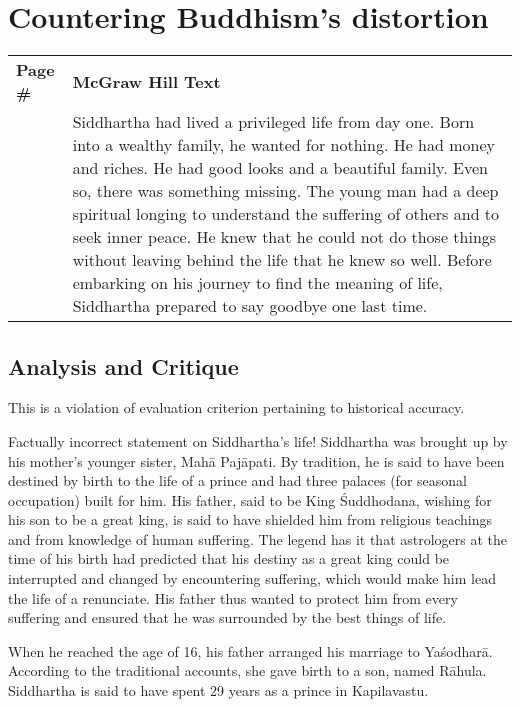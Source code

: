 \chapter{Countering Buddhism's distortion}

{\renewcommand{\arraystretch}{1.2}
\begin{longtable}{|>{\raggedleft}p{1.5cm}|p{8.5cm}|}
\multicolumn{2}{c}{\textbf{Table: 1}}\\
\hline
\textbf{Page \#} & \textbf{McGraw Hill Text} \tabularnewline
\hline 
260 & Siddhartha had lived a privileged life from day one. Born into a wealthy family, he wanted for nothing. He had money and riches. He had good looks and a beautiful family. Even so, there was something missing. The young man had a deep spiritual longing to understand the suffering of others and to seek inner peace. He knew that he could not do those things without leaving behind the life that he knew so well. Before embarking on his journey to find the meaning of life, Siddhartha prepared to say goodbye one last time.\tabularnewline
\hline
\end{longtable}}
\medskip

\section*{Analysis and Critique} 

This is a violation of evaluation criterion pertaining to historical accuracy.
\vskip 3pt

Factually incorrect statement on Siddhartha's life! Siddhartha was brought up by his mother's younger sister, Mahā Pajāpati. By tradition, he is said to have been destined by birth to the life of a prince and had three palaces (for seasonal occupation) built for him. His father, said to be King Śuddhodana, wishing for his son to be a great king, is said to have shielded him from religious teachings and from knowledge of human suffering. The legend has it that astrologers at the time of his birth had predicted that his destiny as a great king could be interrupted and changed by encountering suffering, which would make him lead the life of a renunciate. His father thus wanted to protect him from every suffering and ensured that he was surrounded by the best things of life.
\newpage

When he reached the age of 16, his father arranged his marriage to Yaśodharā. According to the traditional accounts, she gave birth to a son, named Rāhula. Siddhartha is said to have spent 29 years as a prince in Kapilavastu. 

